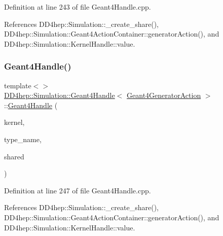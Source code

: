 Definition at line 243 of file Geant4\+Handle.\+cpp.



References D\+D4hep\+::\+Simulation\+::\+\_\+create\+\_\+share(), D\+D4hep\+::\+Simulation\+::\+Geant4\+Action\+Container\+::generator\+Action(), and D\+D4hep\+::\+Simulation\+::\+Kernel\+Handle\+::value.

\hypertarget{class_d_d4hep_1_1_simulation_1_1_geant4_handle_a8f56de22e3473bea5858f081a07a45f0}{}\label{class_d_d4hep_1_1_simulation_1_1_geant4_handle_a8f56de22e3473bea5858f081a07a45f0} 
\subsubsection{\texorpdfstring{Geant4\+Handle()}{Geant4Handle()}\hspace{0.1cm}{\footnotesize\ttfamily [13/20]}}
{\footnotesize\ttfamily template$<$$>$ \\
\hyperlink{class_d_d4hep_1_1_simulation_1_1_geant4_handle}{D\+D4hep\+::\+Simulation\+::\+Geant4\+Handle}$<$ \hyperlink{class_d_d4hep_1_1_simulation_1_1_geant4_generator_action}{Geant4\+Generator\+Action} $>$\+::\hyperlink{class_d_d4hep_1_1_simulation_1_1_geant4_handle}{Geant4\+Handle} (\begin{DoxyParamCaption}\item[{\hyperlink{class_d_d4hep_1_1_simulation_1_1_geant4_kernel}{Geant4\+Kernel} \&}]{kernel,  }\item[{const char $\ast$}]{type\+\_\+name,  }\item[{bool}]{shared }\end{DoxyParamCaption})}



Definition at line 247 of file Geant4\+Handle.\+cpp.



References D\+D4hep\+::\+Simulation\+::\+\_\+create\+\_\+share(), D\+D4hep\+::\+Simulation\+::\+Geant4\+Action\+Container\+::generator\+Action(), and D\+D4hep\+::\+Simulation\+::\+Kernel\+Handle\+::value.

\hypertarget{class_d_d4hep_1_1_simulation_1_1_geant4_handle_ab90402e56522f151112db915738f56c2}{}\label{class_d_d4hep_1_1_simulation_1_1_geant4_handle_ab90402e56522f151112db915738f56c2} 
